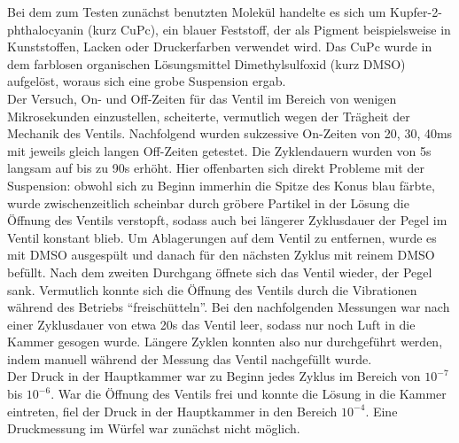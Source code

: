  
Bei dem zum Testen zunächst benutzten Molekül
handelte es sich um Kupfer-2-phthalocyanin (kurz
CuPc), ein blauer Feststoff, der als Pigment
beispielsweise in Kunststoffen, Lacken oder
Druckerfarben verwendet wird. Das CuPc wurde in
dem farblosen organischen Lösungsmittel
Dimethylsulfoxid (kurz DMSO) aufgelöst, woraus
sich eine grobe Suspension ergab.\\ 
Der Versuch, On- und Off-Zeiten für das Ventil im
Bereich von wenigen Mikrosekunden einzustellen,
scheiterte, vermutlich wegen der Trägheit der Mechanik des
Ventils. Nachfolgend wurden sukzessive
On-Zeiten von 20, 30, 40ms mit jeweils gleich
langen Off-Zeiten getestet. Die Zyklendauern
wurden von 5s langsam auf bis zu 90s erhöht.
Hier offenbarten sich direkt Probleme mit der
Suspension: obwohl sich zu Beginn immerhin die
Spitze des Konus blau färbte, wurde
zwischenzeitlich scheinbar durch gröbere Partikel
in der Lösung die Öffnung des Ventils verstopft,
sodass auch bei längerer Zyklusdauer der Pegel im
Ventil konstant blieb. Um Ablagerungen auf dem
Ventil zu entfernen, wurde es mit DMSO ausgespült
und danach für den nächsten Zyklus mit reinem
DMSO befüllt. Nach dem zweiten Durchgang öffnete
sich das Ventil wieder, der Pegel sank.
Vermutlich konnte sich die Öffnung des Ventils
durch die Vibrationen während des Betriebs
"`freischütteln"'. Bei den nachfolgenden
Messungen war nach einer Zyklusdauer von etwa 20s
das Ventil leer, sodass nur noch Luft in die
Kammer gesogen wurde.
Längere Zyklen konnten also nur durchgeführt
werden, indem manuell während der Messung das
Ventil nachgefüllt wurde.
\\
Der Druck in der Hauptkammer war zu Beginn jedes
Zyklus im Bereich von $10^{-7}$ bis $10^{-6}$.
War die Öffnung des Ventils frei und konnte die
Lösung in die Kammer eintreten, fiel der Druck in
der Hauptkammer in den Bereich $10^{-4}$. Eine
Druckmessung im Würfel war zunächst nicht möglich.\\
































